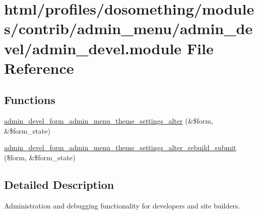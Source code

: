 \hypertarget{admin__devel_8module}{
\section{html/profiles/dosomething/modules/contrib/admin\_\-menu/admin\_\-devel/admin\_\-devel.module File Reference}
\label{admin__devel_8module}
}
\subsection*{Functions}
\begin{DoxyCompactItemize}
\item 
\hyperlink{admin__devel_8module_a46d2ed6e74a5cb9edbe85d443e6186e9}{admin\_\-devel\_\-form\_\-admin\_\-menu\_\-theme\_\-settings\_\-alter} (\&\$form, \&\$form\_\-state)
\item 
\hyperlink{admin__devel_8module_a290cc8b8ee7dda4f8eb2ebbee37fb2c5}{admin\_\-devel\_\-form\_\-admin\_\-menu\_\-theme\_\-settings\_\-alter\_\-rebuild\_\-submit} (\$form, \&\$form\_\-state)
\end{DoxyCompactItemize}


\subsection{Detailed Description}
Administration and debugging functionality for developers and site builders. 

